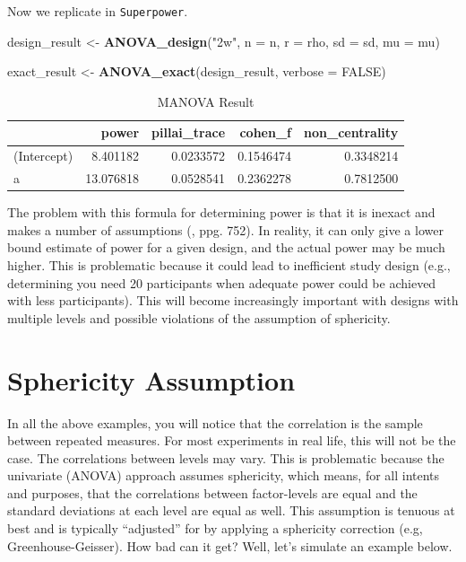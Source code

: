 \documentclass[
]{book}
\newenvironment{Shaded}{\begin{snugshade}}{\end{snugshade}}
\newcommand{\DataTypeTok}[1]{\textcolor[rgb]{0.13,0.29,0.53}{#1}}
\newcommand{\KeywordTok}[1]{\textcolor[rgb]{0.13,0.29,0.53}{\textbf{#1}}}
\newcommand{\NormalTok}[1]{#1}
\newcommand{\OtherTok}[1]{\textcolor[rgb]{0.56,0.35,0.01}{#1}}
\newcommand{\StringTok}[1]{\textcolor[rgb]{0.31,0.60,0.02}{#1}}
\begin{document}
Now we replicate in \texttt{Superpower}.

\begin{Shaded}
\begin{Highlighting}[]
\NormalTok{design_result <-}\StringTok{ }\KeywordTok{ANOVA_design}\NormalTok{(}\StringTok{"2w"}\NormalTok{,}
                              \DataTypeTok{n =}\NormalTok{ n,}
                              \DataTypeTok{r =}\NormalTok{ rho,}
                              \DataTypeTok{sd =}\NormalTok{ sd,}
                              \DataTypeTok{mu =}\NormalTok{ mu)}

\NormalTok{exact_result <-}\StringTok{ }\KeywordTok{ANOVA_exact}\NormalTok{(design_result, }\DataTypeTok{verbose =} \OtherTok{FALSE}\NormalTok{)}
\end{Highlighting}
\end{Shaded}

\begin{table}[!h]

\caption{\label{tab:unnamed-chunk-128}MANOVA Result}
\centering
\begin{tabular}[t]{l|r|r|r|r}
\hline
  & power & pillai\_trace & cohen\_f & non\_centrality\\
\hline
(Intercept) & 8.401182 & 0.0233572 & 0.1546474 & 0.3348214\\
\hline
a & 13.076818 & 0.0528541 & 0.2362278 & 0.7812500\\
\hline
\end{tabular}
\end{table}

The problem with this formula for determining power is that it is inexact and makes a number of assumptions (\citet{maxwell_designing_2004}, ppg. 752). In reality, it can only give a lower bound estimate of power for a given design, and the actual power may be much higher. This is problematic because it could lead to inefficient study design (e.g., determining you need 20 participants when adequate power could be achieved with less participants). This will become increasingly important with designs with multiple levels and possible violations of the assumption of sphericity.

\newpage

\hypertarget{sphericity-assumption}{%
\section{Sphericity Assumption}\label{sphericity-assumption}}

In all the above examples, you will notice that the correlation is the sample between repeated measures. For most experiments in real life, this will not be the case. The correlations between levels may vary. This is problematic because the univariate (ANOVA) approach assumes sphericity, which means, for all intents and purposes, that the correlations between factor-levels are equal and the standard deviations at each level are equal as well. This assumption is tenuous at best and is typically ``adjusted'' for by applying a sphericity correction (e.g, Greenhouse-Geisser). How bad can it get? Well, let's simulate an example below.
\end{document}
